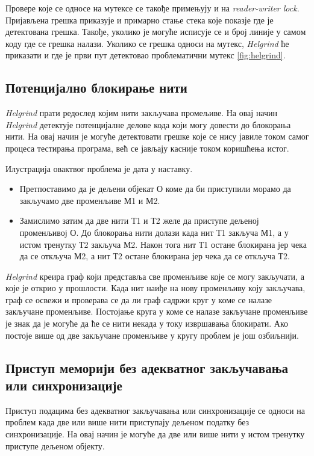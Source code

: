 \documentclass[12pt,oneside]{memoir}
\begin{document}
\indent Провере које се односе на мутексе се такође примењују и на \textit{reader-writer lock}. Пријављена грешка приказује и примарно стање стека које показје где је детектована грешка. Такође, уколико је могуће исписује се и број линије у самом коду где се грешка налази. Уколико се грешка односи на мутекс, \textit{Helgrind} ће приказати и где је први пут детектовао проблематични мутекс \ref{fig:helgrind}. 

\subsection{Потенцијално блокирање нити}

\indent \textit{Helgrind} прати редослед којим нити закључава промељиве. На овај начин \textit{Helgrind} детектује потенцијалне делове кода који могу довести до блокорања нити. На овај начин је могуће детектовати грешке које се нису јавиле током самог процеса тестирања програма, већ се јављају касније током коришћења истог.

\indent Илустрација овактвог проблема је дата у наставку.

\begin{itemize}
  \item Претпоставимо да је дељени објекат О коме да би приступили морамо да закључамо две променљиве М1 и М2.
  \item  Замислимо затим да две нити Т1 и Т2 желе да приступе дељеној променљивој О. До блокорања нити долази када нит Т1 закључа М1, а у истом тренутку Т2 закључа М2. Након тога нит Т1 остане блокирана јер чека да се откључа М2, а нит Т2 остане блокирана јер чека да се откључа Т2.
\end{itemize}


\indent \textit{Helgrind} креира граф који представља све променљиве које се могу закључати, а које је открио у прошлости. Када нит наиђе на нову променљиву коју закључава, граф се освежи и проверава се да ли граф садржи круг у коме се налазе закључане променљиве. Постојање круга у коме се налазе закључане променљиве је знак да је могуће да ће се нити некада у току извршавања блокирати. Ако постоје више од две закључане променљиве у кругу проблем је још озбиљнији.


\subsection{Приступ меморији без адекватног закључавања или синхронизације}

\indent Приступ подацима без адекватног закључавања или синхронизације се односи на проблем када две или више нити приступају дељеном податку без синхронизације. На овај начин је могуће да две или више нити у истом тренутку приступе дељеном објекту. 
\end{document}
